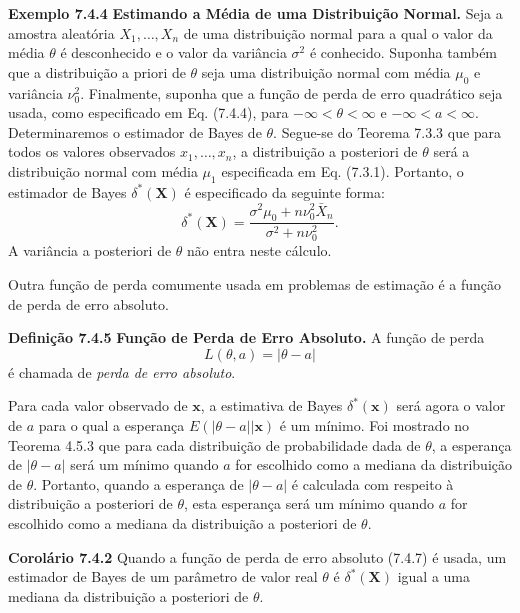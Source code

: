 \noindent\textbf{Exemplo 7.4.4} \quad \textbf{Estimando a Média de uma Distribuição Normal.} Seja a amostra aleatória $X_1, \dots, X_n$ de uma distribuição normal para a qual o valor da média $\theta$ é desconhecido e o valor da variância $\sigma^2$ é conhecido. Suponha também que a distribuição a priori de $\theta$ seja uma distribuição normal com média $\mu_0$ e variância $\nu_0^2$. Finalmente, suponha que a função de perda de erro quadrático seja usada, como especificado em Eq. (7.4.4), para $-\infty<\theta<\infty$ e $-\infty<a<\infty$. Determinaremos o estimador de Bayes de $\theta$.
Segue-se do Teorema 7.3.3 que para todos os valores observados $x_1, \dots, x_n$, a distribuição a posteriori de $\theta$ será a distribuição normal com média $\mu_1$ especificada em Eq. (7.3.1). Portanto, o estimador de Bayes $\delta^*(\mathbf{X})$ é especificado da seguinte forma:
\begin{equation}
\delta^*(\mathbf{X}) = \frac{\sigma^2\mu_0+n\nu_0^2\bar{X}_n}{\sigma^2+n\nu_0^2}. \tag{7.4.6}
\end{equation}
A variância a posteriori de $\theta$ não entra neste cálculo.

Outra função de perda comumente usada em problemas de estimação é a função de perda de erro absoluto.

\vspace{1cm}
\noindent\textbf{Definição 7.4.5} \quad \textbf{Função de Perda de Erro Absoluto.} A função de perda
\begin{equation}
L(\theta, a) = |\theta-a| \tag{7.4.7}
\end{equation}
é chamada de \textit{perda de erro absoluto}.

\vspace{1cm}
Para cada valor observado de $\mathbf{x}$, a estimativa de Bayes $\delta^*(\mathbf{x})$ será agora o valor de $a$ para o qual a esperança $E(|\theta-a||\mathbf{x})$ é um mínimo. Foi mostrado no Teorema 4.5.3 que para cada distribuição de probabilidade dada de $\theta$, a esperança de $|\theta-a|$ será um mínimo quando $a$ for escolhido como a mediana da distribuição de $\theta$. Portanto, quando a esperança de $|\theta-a|$ é calculada com respeito à distribuição a posteriori de $\theta$, esta esperança será um mínimo quando $a$ for escolhido como a mediana da distribuição a posteriori de $\theta$.

\vspace{1cm}
\noindent\textbf{Corolário 7.4.2} \quad Quando a função de perda de erro absoluto (7.4.7) é usada, um estimador de Bayes de um parâmetro de valor real $\theta$ é $\delta^*(\mathbf{X})$ igual a uma mediana da distribuição a posteriori de $\theta$.

